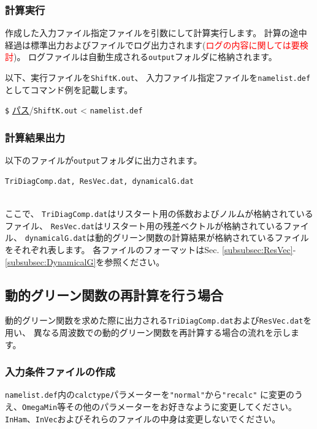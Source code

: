 \documentclass[12pt,titlepage]{jarticle}
\begin{document}
\subsubsection*{計算実行}
作成した入力ファイル指定ファイルを引数にして計算実行します。
計算の途中経過は標準出力およびファイルでログ出力されます(\textcolor{red}{ログの内容に関しては要検討})。
ログファイルは自動生成される\verb|output|フォルダに格納されます。

以下、実行ファイルを\verb|ShiftK.out|、
入力ファイル指定ファイルを\verb|namelist.def|としてコマンド例を記載します。

\verb|$| \underline{パス}/\verb|ShiftK.out| < \verb|namelist.def|

\subsubsection*{計算結果出力}
以下のファイルが\verb|output|フォルダに出力されます。
\\
\begin{minipage}{11cm}
\begin{screen}
\begin{verbatim}
TriDiagComp.dat, ResVec.dat, dynamicalG.dat
\end{verbatim}
\end{screen}
\end{minipage}
\\
ここで、
\verb|TriDiagComp.dat|はリスタート用の係数およびノルムが格納されているファイル、
\verb|ResVec.dat|はリスタート用の残差ベクトルが格納されているファイル、
\verb|dynamicalG.dat|は動的グリーン関数の計算結果が格納されているファイルをそれぞれ表します。
各ファイルのフォーマットはSec. \ref{subsubsec:ResVec}-\ref{subsubsec:DynamicalG}を参照ください。

\subsection{動的グリーン関数の再計算を行う場合}
動的グリーン関数を求めた際に出力される\verb|TriDiagComp.dat|および\verb|ResVec.dat|を用い、
異なる周波数での動的グリーン関数を再計算する場合の流れを示します。
\subsubsection*{入力条件ファイルの作成}
\verb|namelist.def|内の\verb|calctype|パラメーターを\verb|"normal"|から\verb|"recalc"|
に変更のうえ、\verb|OmegaMin|等その他のパラメーターをお好きなように変更してください。
\verb|InHam|、\verb|InVec|およびそれらのファイルの中身は変更しないでください。
\end{document}
